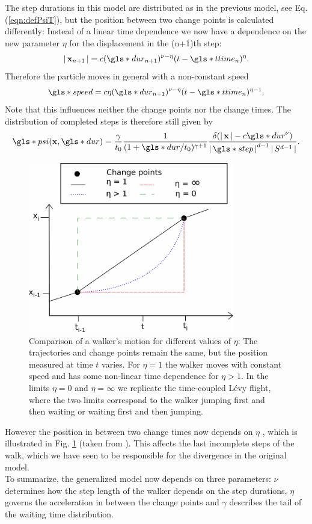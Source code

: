 The step durations in this model are distributed as in the previous model, see Eq. (\ref{eqn:defPsiT}), but the position between two change points is calculated differently: Instead of a linear time dependence we now have a dependence on the new parameter $\eta$ for the displacement in the (n+1)th step:
%
\begin{align}
\abs{\ve{x}_{n+1}} = c (\gls*{dur}_{n+1})^{\nu-\eta} (t-\gls*{ttime}_n)^{\eta} .
\end{align}
%
Therefore the particle moves in general with a non-constant speed  
%
\begin{align}
\gls*{speed} = c \eta (\gls*{dur}_{n+1})^{\nu-\eta} (t-\gls*{ttime}_n)^{\eta-1} .
\end{align}
%
Note that this influences neither the change points nor the change times. The distribution of completed steps is therefore still given by 
%
\begin{align}
\gls*{psi}(\ve{x}, \gls*{dur} ) = \frac{\gamma}{t_0} \frac{1}{(1+\gls*{dur}/t_0)^{\gamma+1}}  \frac{\delta(\abs{\ve{x}} - c \gls*{dur}^{\nu}) }{\abs{\gls*{step}}^{d-1} \abs{S^{d-1}}}  .
\end{align}
%
\begin{figure}[!htb]
\begin{center}
\includegraphics[width=90mm]{pics/turningPoints.png}
\caption{Comparison of a walker's motion for different values of $\eta$: The trajectories and change points remain the same, but the position measured at time $t$ varies. For $\eta = 1$ the walker moves with constant speed and has some non-linear time dependence for $\eta > 1$. In the limits $\eta = 0$ and $\eta = \infty$ we replicate the time-coupled L\'evy flight, where the two limits correspond to the walker jumping first and then waiting or waiting first and then jumping. 
\label{fig:turningPoints}}
\end{center}
\end{figure}
%
However the position in between two change times now depends on $\eta$ 
\cite{radons2018}, 
which is  illustrated in Fig. \ref{fig:turningPoints} (taken from 
\cite{bothe}). 
This affects the last incomplete steps of the walk, which we have seen to be responsible for the divergence in the original model. \\
To summarize, the generalized model now depends on three parameters: $\nu$ determines how the step length of the walker depends on the step durations, $\eta$ governs the acceleration in between the change points and $\gamma$ describes the tail of the waiting time distribution. 


